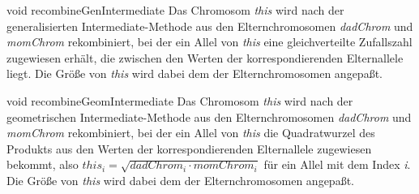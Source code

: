 \documentclass{report}
\begin{document}
\newpage

\setNormalInstance
\setCorrectWidthThree{8pt}
\printMethodWithParamsSaved
{void}
{}
{recombineGenIntermediate}
{Das Chromosom {\em this} wird nach der generalisierten Intermediate-Methode
    aus den Elternchromosomen {\em dadChrom} und {\em momChrom} rekombiniert, bei der ein
    Allel von {\em this} eine gleichverteilte Zufallszahl zugewiesen erh\"alt, die 
    zwischen den Werten der korrespondierenden Elternallele liegt.
    Die Gr\"o{\ss}e von {\em this} wird dabei dem der Elternchromosomen angepa{\ss}t.}
{}
\setCorrectWidthThree{4pt}

\vspace{4ex}

\setNormalInstance
\setCorrectWidthThree{8pt}
\printMethodWithParamsSaved
{void}
{}
{recombineGeomIntermediate}
{Das Chromosom {\em this} wird nach der geometrischen Intermediate-Methode
    aus den Elternchromosomen {\em dadChrom} und {\em momChrom} rekombiniert, bei der ein
    Allel von {\em this} die Quadratwurzel des Produkts aus den Werten der 
    korrespondierenden Elternallele zugewiesen bekommt, also
    $this_i = \sqrt{dadChrom_i \cdot momChrom_i}$ f\"ur ein Allel mit dem Index
    {\em i}.
    Die Gr\"o{\ss}e von {\em this} wird dabei dem der Elternchromosomen angepa{\ss}t.}
{}
\setCorrectWidthThree{4pt}
\end{document}
